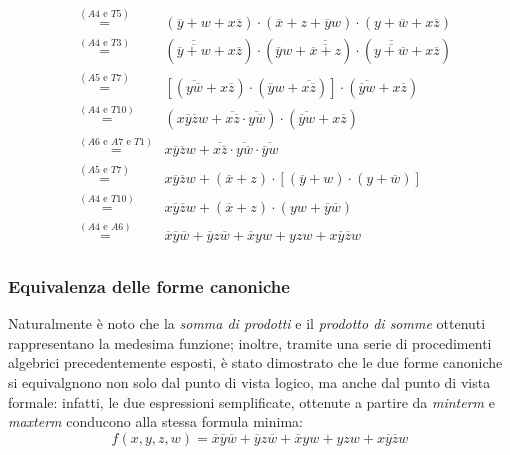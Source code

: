 \documentclass[a4paper]{extarticle}
\begin{document}
\begin{eqnarray*}
  &\overset{\left(A4 \text{ e } T5\right)}{=}& \left(\overline{y} + w + x\overline{z}\right) \cdot \left(\overline{x} + z + \overline{y}w \right) \cdot \left(y + \overline{w} + x\overline{z}\right)\\
  &\overset{\left(A4 \text{ e } T3\right)}{=}& \left(\overline{\overline{\overline{y} + w}} + x\overline{z}\right) \cdot \left(\overline{y}w + \overline{\overline{\overline{x} + z}} \right) \cdot \left(\overline{\overline{y + \overline{w}}} + x\overline{z}\right)\\
  &\overset{\left(A5 \text{ e } T7\right)}{=}& \left[\left(\overline{y\overline{w}} + x\overline{z}\right) \cdot \left(\overline{y}w + \overline{x\overline{z}} \right) \right] \cdot \left(\overline{\overline{y}w} + x\overline{z}\right)\\
  &\overset{\left(A4 \text{ e } T10\right)}{=}& \left(x\overline{y}\overline{z}w + \overline{x\overline{z}} \cdot \overline{y\overline{w}}\right) \cdot \left(\overline{\overline{y}w} + x\overline{z}\right)\\
  &\overset{\left(A6 \text{ e } A7 \text{ e } T1\right)}{=}& x\overline{y}\overline{z}w + \overline{x\overline{z}} \cdot \overline{y\overline{w}} \cdot \overline{\overline{y}w}\\
  &\overset{\left(A5 \text{ e } T7\right)}{=}& x\overline{y}\overline{z}w + \left(\overline{x} + z\right) \cdot \left[\left(\overline{y} + w\right) \cdot \left(y + \overline{w}\right)\right]\\
  &\overset{\left(A4 \text{ e } T10\right)}{=}& x\overline{y}\overline{z}w + \left(\overline{x} + z\right) \cdot \left(yw + \overline{y}\overline{w}\right)\\
  &\overset{\left(A4 \text{ e } A6\right)}{=}& \overline{x}\overline{y}\overline{w} + \overline{y}z\overline{w} + \overline{x}yw + yzw + x\overline{y}\overline{z}w\\
\end{eqnarray*}

\vspace{1em}
\subsubsection{Equivalenza delle forme canoniche}
Naturalmente è noto che la \emph{somma di prodotti} e il \emph{prodotto di somme} ottenuti rappresentano la medesima funzione; inoltre, tramite una serie di procedimenti algebrici precedentemente esposti, è stato dimostrato che le due forme canoniche si equivalgnono non solo dal punto di vista logico, ma anche dal punto di vista formale: infatti, le due espressioni semplificate, ottenute a partire da \emph{minterm} e \emph{maxterm} conducono alla stessa formula minima:
\[f(x,y,z,w) = \overline{x}\overline{y}\overline{w} + \overline{y}z\overline{w} + \overline{x}yw + yzw + x\overline{y}\overline{z}w\]
\end{document}
